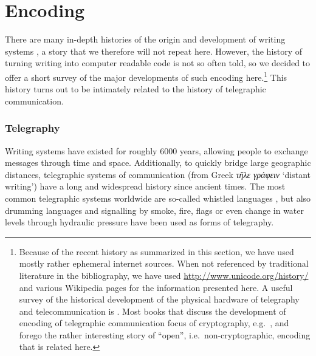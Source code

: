 \section{Encoding}
\label{encoding}

There are many in-depth histories of the origin and development of writing
systems \citep[e.g.~][]{Robinson1995,Powell2012}, a story that we therefore will
not repeat here. However, the history of turning writing into computer readable
code is not so often told, so we decided to offer a short survey of the major
developments of such encoding here.\footnote{Because of the recent
history as summarized in this section, we have used mostly rather ephemeral
internet sources. When not referenced by traditional literature in the
bibliography, we have used \url{http://www.unicode.org/history/} and various
Wikipedia pages for the information presented here. A useful survey of the
historical development of the physical hardware of telegraphy and
telecommunication is \citet{Huurdeman2003}. Most books that discuss the
development of encoding of telegraphic communication focus of cryptography,
e.g.~\citet{Singh1999}, and forego the rather interesting story of ``open'',
i.e.~non-cryptographic, encoding that is related here.} This history turns out
to be intimately related to the history of telegraphic communication.

\subsubsection*{Telegraphy}

Writing systems have existed for roughly 6000 years, allowing people to exchange
messages through time and space. Additionally, to quickly bridge large geographic
distances, telegraphic systems of communication (from Greek \emph{τῆλε
γράφειν} `distant writing') have a long and widespread history since ancient
times. The most common telegraphic systems worldwide are so-called whistled
languages \citep{Meyer2015}, but also drumming languages \citep{Meyer2012} and
signalling by smoke, fire, flags or even change in water levels through
hydraulic pressure have been used as forms of telegraphy. 

